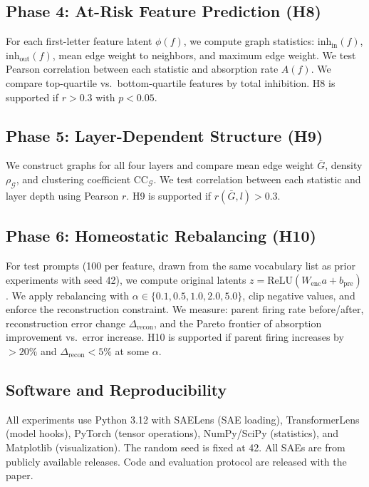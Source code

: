 \documentclass{article}
\begin{document}
\subsection{Phase 4: At-Risk Feature Prediction (H8)}

For each first-letter feature latent $\phi(f)$, we compute graph statistics: $\text{inh}_{\text{in}}(f)$, $\text{inh}_{\text{out}}(f)$, mean edge weight to neighbors, and maximum edge weight. We test Pearson correlation between each statistic and absorption rate $A(f)$. We compare top-quartile vs.\ bottom-quartile features by total inhibition. H8 is supported if $r > 0.3$ with $p < 0.05$.

\subsection{Phase 5: Layer-Dependent Structure (H9)}

We construct graphs for all four layers and compare mean edge weight $\bar{G}$, density $\rho_{\mathcal{G}}$, and clustering coefficient $\text{CC}_{\mathcal{G}}$. We test correlation between each statistic and layer depth using Pearson $r$. H9 is supported if $r(\bar{G}, l) > 0.3$.

\subsection{Phase 6: Homeostatic Rebalancing (H10)}

For test prompts (100 per feature, drawn from the same vocabulary list as prior experiments with seed 42), we compute original latents $z = \text{ReLU}(W_{\text{enc}} a + b_{\text{pre}})$. We apply rebalancing with $\alpha \in \{0.1, 0.5, 1.0, 2.0, 5.0\}$, clip negative values, and enforce the reconstruction constraint. We measure: parent firing rate before/after, reconstruction error change $\Delta_{\text{recon}}$, and the Pareto frontier of absorption improvement vs.\ error increase. H10 is supported if parent firing increases by $>20\%$ and $\Delta_{\text{recon}} < 5\%$ at some $\alpha$.

\subsection{Software and Reproducibility}

All experiments use Python 3.12 with SAELens (SAE loading), TransformerLens (model hooks), PyTorch (tensor operations), NumPy/SciPy (statistics), and Matplotlib (visualization). The random seed is fixed at 42. All SAEs are from publicly available releases. Code and evaluation protocol are released with the paper.
\end{document}
